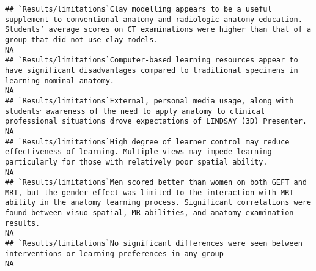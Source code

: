 \documentclass[]{article}
\begin{document}
\begin{verbatim}
## `Results/limitations`Clay modelling appears to be a useful supplement to conventional anatomy and radiologic anatomy education. Students’ average scores on CT examinations were higher than that of a group that did not use clay models.                                                                                                                                                                                                                                            NA
## `Results/limitations`Computer-based learning resources appear to have significant disadvantages compared to traditional specimens in learning nominal anatomy.                                                                                                                                                                                                                                                                                                                        NA
## `Results/limitations`External, personal media usage, along with students׳ awareness of the need to apply anatomy to clinical professional situations drove expectations of LINDSAY (3D) Presenter.                                                                                                                                                                                                                                                                                    NA
## `Results/limitations`High degree of learner control may reduce effectiveness of learning. Multiple views may impede learning particularly for those with relatively poor spatial ability.                                                                                                                                                                                                                                                                                             NA
## `Results/limitations`Men scored better than women on both GEFT and MRT, but the gender effect was limited to the interaction with MRT ability in the anatomy learning process. Significant correlations were found between visuo-spatial, MR abilities, and anatomy examination results.                                                                                                                                                                                              NA
## `Results/limitations`No significant differences were seen between interventions or learning preferences in any group                                                                                                                                                                                                                                                                                                                                                                  NA

\end{verbatim}
\end{document}
